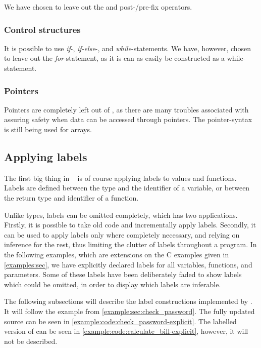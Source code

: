 We have chosen to leave out the \tk{++} and \tk{-{}-} post-/pre-fix operators.

\subsubsection{Control structures}
It is possible to use \emph{if}-, \emph{if-else}-, and \emph{while}-statements.
We have, however, chosen to leave out the \emph{for}-statement, as it is can as easily be constructed as a while-statement.

\subsubsection{Pointers}
Pointers are completely left out of \thelang, as there are many troubles associated with assuring safety when data can be accessed through pointers.
The pointer-syntax is still being used for arrays.

\subsection{Applying labels}
The first big thing in \thelang~ is of course applying labels to values and functions.
Labels are defined between the type and the identifier of a variable, or between the return type and identifier of a function.

Unlike types, labels can be omitted completely, which has two applications.
Firstly, it is possible to take old code and incrementally apply labels.
Secondly, it can be used to apply labels only where completely necessary, and relying on inference for the rest, thus limiting the clutter of labels throughout a program.
In the following examples, which are extensions on the C examples given in \cref{examples:sec}, we have explicitly declared labels for all variables, functions, and parameters.
Some of these labels have been deliberately faded to show labels which could be omitted, in order to display which labels are inferable.

The following subsections will describe the label constructions implemented by \thelang.
It will follow the  example from \cref{example:sec:check_password}.
The fully updated source can be seen in \cref{example:code:check_password-explicit}.
The labelled version of  can be seen in \cref{example:code:calculate_bill-explicit}, however, it will not be described.




